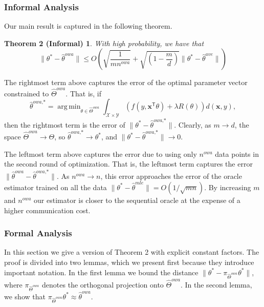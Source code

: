 \documentclass[twoside]{article}
\DeclareMathOperator*{\argmin}{arg\,min}
\newcommand{\nowa}{n^{\textit{owa}}}
\newcommand{\Y}{\mathcal{Y}}
\newcommand{\X}{\mathcal{X}}
\newcommand{\W}{{\hat \Theta^{\textit{owa}}}}
\newcommand{\x}{\mathbf{x}}
\newcommand{\w}{\theta}
\newcommand{\wowa}{\hat\w^{owa}}
\newcommand{\wowastar}{\hat\w^{\textit{owa,*}}}
\newcommand{\wave}{\hat\w^{ave}}
\newcommand{\wmle}{\hat\w^{mle}}
\newcommand{\wstar}{{\w^{*}}}
\newcommand{\trans}[1]{\ensuremath{{#1}^{\mathsf{T}}}}
\newcommand{\ltwo}[1]{{\lVert {#1} \rVert}}
\newcommand{\proj}[1]{\pi_{{#1}}}
\begin{document}
\subsubsection{Informal Analysis}
Our main result is captured in the following theorem.
\newtheorem*{theoreminf}{Theorem 2 (Informal)}
\begin{theoreminf}
With high probability, we have that
\begin{equation}
\nonumber
\ltwo{\wstar-\wowa}
\le
O\!\left(\!\!
    \sqrt{\frac{1}{m\nowa}}
    +
    \sqrt{\left(1-\frac{m}{d}\right)}\ltwo{\wstar-\wave}
\right)
\label{eq:informal}
\end{equation}
\label{thm:informal}
\end{theoreminf}
\vspace{-0.25in}
The rightmost term above captures the error of the optimal parameter vector constrained to $\W$.
That is, if
\begin{equation}
\wowastar = \argmin_{\w\in\W} \int_{\X\times\Y} \left(f(y,\trans\x\w) + \lambda R(\w)\right) d(\x,y)
,
\end{equation}
then the rightmost term is the error of $\ltwo{\wstar-\wowastar}$.
Clearly, as $m \to d$, the space $\W \to \Theta$, so $\wowastar\to\wstar$, and $\ltwo{\wstar-\wowastar}\to 0$.

The leftmost term above captures the error due to using only $\nowa$ data points in the second round of optimization.
That is, the leftmost term captures the error $\ltwo{\wowa-\wowastar}$.
As $\nowa\to n$, this error approaches the error of the oracle estimator trained on all the data $\ltwo{\wstar-\wmle}=O(1/\sqrt{mn})$.
By increasing $m$ and $\nowa$ our estimator is closer to the sequential oracle
at the expense of a higher communication cost.

\subsubsection{Formal Analysis}

In this section we give a version of Theorem 2 with explicit constant factors.
The proof is divided into two lemmas,
which we present first because they introduce important notation.
In the first lemma we bound the distance $\ltwo{\wstar-\proj{\W}\wstar}$,
where $\proj{\W}$ denotes the orthogonal projection onto $\W$.
In the second lemma, we show that $\proj{\W}\wstar \approx \wowa$.
\end{document}
